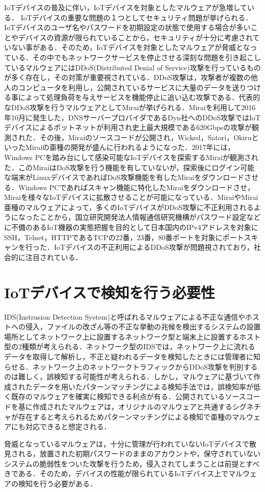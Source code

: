 IoTデバイスの普及に伴い，IoTデバイスを対象としたマルウェアが急増している．
IoTデバイスの重要な問題の１つとしてセキュリティ問題が挙げられる．IoTデバイスのユーザ名やパスワードを初期設定の状態で使用する場合が多いことやデバイスの資源が限られていることから，セキュリティが十分に考慮されていない事がある．そのため，IoTデバイスを対象としたマルウェアが脅威となっている．その中でもネットワークサービスを停止させる深刻な問題を引き起こしているマルウェアにはDDoS(Distributed Denial of Service)攻撃を行っているものが多く存在し，その対策が重要視されている．DDoS攻撃は，攻撃者が複数の他人のコンピュータを利用し，公開されているサービスに大量のデータを送りつける事によって処理負荷を与えサービスを機能停止に追い込む攻撃である．代表的なDDoS攻撃を行うマルウェアとしてMiraiが挙げられる．Miraiを利用して2016年10月に発生した，DNSサーバープロバイダであるDyn社へのDDoS攻撃ではIoTデバイスによるボットネットが利用され史上最大規模である620Gbpsの攻撃が観測された\cite{Dyn}．その後，Miraiのソースコード\cite{code}が公開され，Wicked\cite{Wicked}，Satori\cite{Satori}，Okiru\cite{Okiru}といったMiraiの亜種の開発が盛んに行われるようになった．2017年には，Windows PCを踏み台にして感染可能なIoTデバイスを探索するMiraiが観測された\cite{newMirai}．このMiraiはDoS攻撃を行う機能を有していないが，探索後にログイン可能な端末がLinuxデバイスであればDoS攻撃機能を有したMiraiをダウンロードさせる．Windows PCであればスキャン機能に特化したMiraiをダウンロードさせ，Miraiを様々なIoTデバイスに拡散させることが可能になっている．MiraiやMirai亜種のマルウェアによって，多くのIoTデバイスがDDoS攻撃に不正利用されるようになったことから，国立研究開発法人情報通信研究機構がパスワード設定などに不備のあるIoT機器の実態把握を目的として日本国内のIPv4アドレスを対象にSSH，Telnet，HTTPであるTCPの22番，23番，80番ポートを対象にポートスキャンを行った\cite{国立}．IoTデバイスの不正利用によるDDoS攻撃が問題視されており，社会的に注目されている．

\section{IoTデバイスで検知を行う必要性}

IDS(Instrusion Detection System)と呼ばれるマルウェアによる不正な通信やホストへの侵入，ファイルの改ざん等の不正な挙動の兆候を検出するシステムの設置場所としてネットワーク上に設置するネットワーク型と端末上に設置するホスト型の2種類が考えられる．ネットワーク型のIDSでは，ネットワーク上に流れるデータを取得して解析し，不正と疑われるデータを検知したときには管理者に知らせる．ネットワーク上のネットワークトラフィックからDDoS攻撃を判別するのは難しく，誤検知する可能性が考えられる．しかし，マルウェアに基づいて作成されたデータを用いたパターンマッチングによる検知手法では，誤検知率が低く既存のマルウェアを確実に検知できる利点が有る．公開されているソースコードを基に作成されたマルウェアは，オリジナルのマルウェアと共通するシグネチャが存在すると考えられるためパターンマッチングによる検知で亜種のマルウェアにも対応できると想定される．\par
脅威となっているマルウェアは，十分に管理が行われていないIoTデバイスで散見される，放置された初期パスワードのままのアカウントや，保守されていないシステムの脆弱性をついた攻撃を行うため，侵入されてしまうことは前提とすべきである．そのため，デバイスの性能が限られているIoTデバイス上でマルウェアの検知を行う必要がある．

